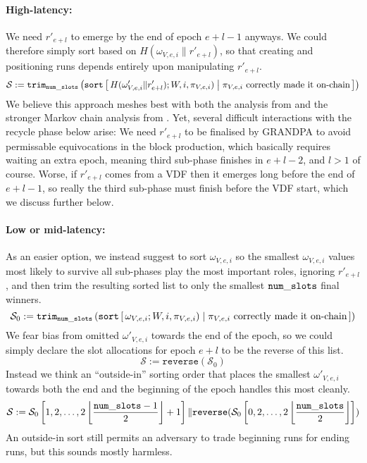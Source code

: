 \paragraph{High-latency:} 
We need $r'_{e+l}$ to emerge by the end of epoch $e+l-1$ anyways.  We could therefore simply sort based on $H(\omega_{V,e,i} \| r'_{e+l})$, so that creating and positioning runs depends entirely upon manipulating $r'_{e+l}$. 
$$ \mathcal{S} := \mathtt{trim}_\vrfaslotsbound\left( \mathtt{sort} \Listst{
  H(\omega'_{V,e,i} \| r'_{e+l}); W,i,\pi_{V,e,i}) 
}{
  \pi_{V,e,i} \text{ correctly made it on-chain}
} \right) $$
We believe this approach meshes best with both the analysis from \cite{Praos} and the stronger Markov chain analysis from \cite{Kiffer18}.  Yet, several difficult interactions with the recycle phase below arise:  We need $r'_{e+l}$ to be finalised by GRANDPA to avoid permissable equivocations in the block production, which basically requires waiting an extra epoch, meaning third sub-phase finishes in $e+l-2$, and $l>1$ of course.  Worse, if $r'_{e+l}$ comes from a VDF then it emerges long before the end of $e+l-1$, so really the third sub-phase must finish before the VDF start, which we discuss further below.

\paragraph{Low or mid-latency:} 
As an easier option, we instead suggest to sort $\omega_{V,e,i}$ so the smallest $\omega_{V,e,i}$ values most likely to survive all sub-phases play the most important roles, ignoring $r'_{e+l}$, and then trim the resulting sorted list to only the smallest $\mathtt{num\_slots}$ final winners. 
$$ 
\mathcal{S}_0 := \mathtt{trim}_\vrfaslotsbound \left( 
\mathtt{sort} \Listst{
  \omega_{V,e,i}; W,i,\pi_{V,e,i}) 
}{
  \pi_{V,e,i} \text{ correctly made it on-chain} %
} \right) 
$$
We fear bias from omitted $\omega'_{V,e,i}$ towards the end of the epoch, so we could simply declare the slot allocations for epoch $e+l$ to be the reverse of this list.
$$ \mathcal{S} := \mathtt{reverse}( \mathcal{S}_0 )$$
Instead we think an ``outside-in'' sorting order that places the smallest $\omega'_{V,e,i}$ towards both the end and the beginning of the epoch handles this most cleanly.
$$ 
\mathcal{S} := 
  \mathcal{S}_0 \left[ 1,2,\ldots, 2 \left\lfloor {\mathtt{num\_slots}-1 \over 2} \right\rfloor + 1 \right]
\|
  \mathtt{reverse}( \mathcal{S}_0 \left[ 0,2,\ldots, 2 \left\lfloor {\mathtt{num\_slots}\over 2} \right\rfloor \right] )
$$
An outside-in sort still permits an adversary to trade beginning runs for ending runs, but this sounds mostly harmless.

